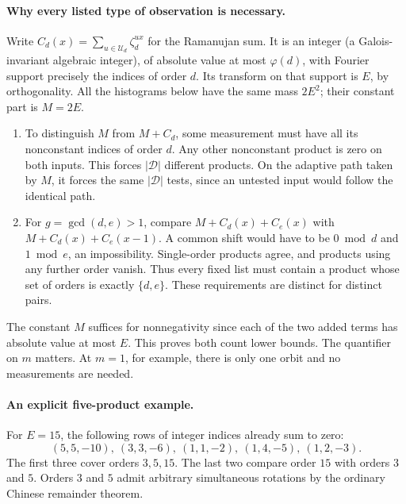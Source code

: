 \documentclass[11pt,letterpaper]{article}
\newcommand{\D}{\mathcal D}\newcommand{\U}{\mathcal U}
\begin{document}
\paragraph{Why every listed type of observation is necessary.}
Write $C_d(x)=\sum_{u\in\U_d}\zeta_d^{ux}$ for the Ramanujan sum. It is an integer (a Galois-invariant algebraic integer), of absolute value at most $\varphi(d)$, with Fourier support precisely the indices of order $d$. Its transform on that support is $E$, by orthogonality. All the histograms below have the same mass $2E^2$; their constant part is $M=2E$.

\begin{enumerate}
\item To distinguish $M$ from $M+C_d$, some measurement must have all its nonconstant indices of order $d$. Any other nonconstant product is zero on both inputs. This forces $|\D|$ different products. On the adaptive path taken by $M$, it forces the same $|\D|$ tests, since an untested input would follow the identical path.
\item For $g=\gcd(d,e)>1$, compare $M+C_d(x)+C_e(x)$ with $M+C_d(x)+C_e(x-1)$. A common shift would have to be $0\bmod d$ and $1\bmod e$, an impossibility. Single-order products agree, and products using any further order vanish. Thus every fixed list must contain a product whose set of orders is exactly $\{d,e\}$. These requirements are distinct for distinct pairs.
\end{enumerate}
The constant $M$ suffices for nonnegativity since each of the two added terms has absolute value at most $E$. This proves both count lower bounds. The quantifier on $m$ matters. At $m=1$, for example, there is only one orbit and no measurements are needed.

\paragraph{An explicit five-product example.}
For $E=15$, the following rows of integer indices already sum to zero:
\[
 (5,5,-10),\ (3,3,-6),\ (1,1,-2),\ (1,4,-5),\ (1,2,-3).
\]
The first three cover orders $3,5,15$. The last two compare order $15$ with orders $3$ and $5$. Orders $3$ and $5$ admit arbitrary simultaneous rotations by the ordinary Chinese remainder theorem.

\newpage
\end{document}
